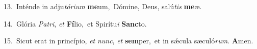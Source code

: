 {\numbfont\textcolor{\numbcolor}{13.}}~Inténde in adju\-\textit{tó}\-\textit{ri}\textit{um} \textbf{me}\-um,~\star Dómine, Deus, salú\textit{tis} \textbf{me}\-æ.\par
{\numbfont\textcolor{\numbcolor}{14.}}~Glória \textit{Pa}\-\textit{tri}, \textit{et} \textbf{Fí}\-lio,~\star et Spirítu\textit{i} \textbf{Sanc}\-to.\par
{\numbfont\textcolor{\numbcolor}{15.}}~Sicut erat in princípio, \textit{et} \textit{nunc}\-, \textit{et} \textbf{sem}\-per,~\star et in sǽcula sæculó\-\textit{rum}\-. \textbf{A}\-men.\par
